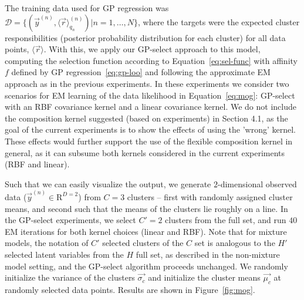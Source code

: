 The training data used for GP regression was $\mathcal{D} = \{ (\vec{y}^{(n)}, \langle \vec{r}\rangle_{q_{n}}^{(n)}) | n = 1, \dots, N \}$, where the targets were the expected cluster responsibilities (posterior probability distribution for each cluster) for all data points, $\langle \vec{r} \rangle$.
With this, we apply our GP-select approach to this model, computing the selection function according to Equation~\eqref{eq:sel-func} with affinity $f$ defined by GP regression~\eqref{eq:gp-loo} 
and following the approximate EM approach as in the previous experiments.
%
In these experiments we consider two scenarios for EM learning of the data likelihood in Equation~\eqref{eq:mog}: GP-select with an RBF covariance kernel and a linear covariance kernel.  
We do not include the composition kernel suggested (based on experiments) in Section 4.1, as the goal of the current experiments is to show the  effects of using the 'wrong' kernel. These effects would further support the use of the flexible composition kernel in general, as it can subsume both kernels considered in the current experiments (RBF and linear).
%

Such that we can easily visualize the output, we generate $2$-dimensional observed data ($\vec{y}^{(n)} \in \mathrm{R}^{D=2} $) from $C=3$ clusters -- first with randomly assigned cluster means, and second such that the means of the clusters lie roughly on a line.
In the GP-select experiments, we select $C' = 2$ clusters from the full set,
and run $40$ EM iterations for both kernel choices (linear and RBF).
Note that for mixture models, the notation of $C'$ selected clusters of the $C$ set is analogous to the $H'$ selected latent variables from the $H$ full set, as described in the non-mixture model setting, and the GP-select algorithm proceeds unchanged.
We randomly initialize the variance of the clusters $\vec{\sigma_c}$ and initialize the cluster means $\vec{\mu_c}$ at randomly selected data points.
Results are shown in Figure~\ref{fig:mog}.

